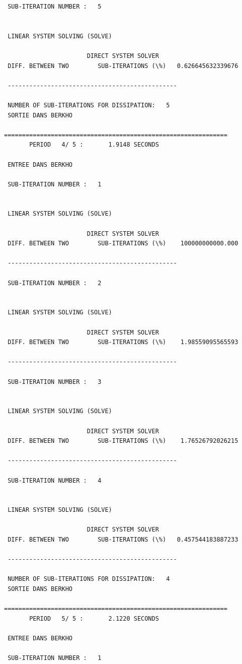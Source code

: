 \begin{verbatim}
 SUB-ITERATION NUMBER :   5


 LINEAR SYSTEM SOLVING (SOLVE)

                       DIRECT SYSTEM SOLVER
 DIFF. BETWEEN TWO        SUB-ITERATIONS (\%)   0.626645632339676

 -----------------------------------------------

 NUMBER OF SUB-ITERATIONS FOR DISSIPATION:   5
 SORTIE DANS BERKHO

==============================================================
       PERIOD   4/ 5 :       1.9148 SECONDS

 ENTREE DANS BERKHO

 SUB-ITERATION NUMBER :   1


 LINEAR SYSTEM SOLVING (SOLVE)

                       DIRECT SYSTEM SOLVER
 DIFF. BETWEEN TWO        SUB-ITERATIONS (\%)    100000000000.000

 -----------------------------------------------

 SUB-ITERATION NUMBER :   2


 LINEAR SYSTEM SOLVING (SOLVE)

                       DIRECT SYSTEM SOLVER
 DIFF. BETWEEN TWO        SUB-ITERATIONS (\%)    1.98559095565593

 -----------------------------------------------

 SUB-ITERATION NUMBER :   3


 LINEAR SYSTEM SOLVING (SOLVE)

                       DIRECT SYSTEM SOLVER
 DIFF. BETWEEN TWO        SUB-ITERATIONS (\%)    1.76526792026215

 -----------------------------------------------

 SUB-ITERATION NUMBER :   4


 LINEAR SYSTEM SOLVING (SOLVE)

                       DIRECT SYSTEM SOLVER
 DIFF. BETWEEN TWO        SUB-ITERATIONS (\%)   0.457544183887233

 -----------------------------------------------

 NUMBER OF SUB-ITERATIONS FOR DISSIPATION:   4
 SORTIE DANS BERKHO

==============================================================
       PERIOD   5/ 5 :       2.1220 SECONDS

 ENTREE DANS BERKHO

 SUB-ITERATION NUMBER :   1



\end{verbatim}
